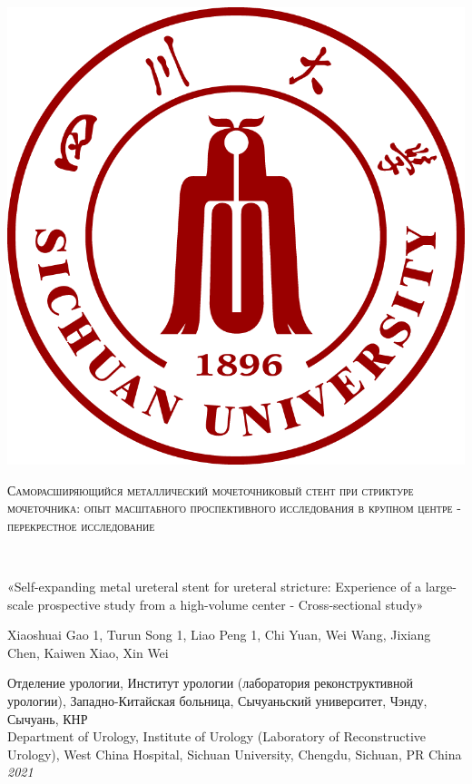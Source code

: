 \vspace*{\fill}
\begin{center}
\includegraphics[scale=0.2]{./res/cover0.png}
{\scshape\huge Саморасширяющийся металлический мочеточниковый стент при стриктуре мочеточника: опыт масштабного проспективного исследования в крупном центре - перекрестное исследование\par}
\vspace{1cm}
\end{center}
\vspace*{\fill}
\newpage

\setlength\columnsep{30pt} 
\begin{multicols}{2}

~\vfill

\noindent 
«Self-expanding metal ureteral stent for ureteral stricture: Experience of a large-scale prospective study from a high-volume center - Cross-sectional study»

 Xiaoshuai Gao 1, Turun Song 1, Liao Peng 1, Chi Yuan, Wei Wang, Jixiang Chen, Kaiwen Xiao, Xin Wei
 
Отделение урологии, Институт урологии (лаборатория реконструктивной урологии), Западно-Китайская больница, Сычуаньский университет, Чэнду, Сычуань, КНР \\

Department of Urology, Institute of Urology (Laboratory of Reconstructive Urology), West China Hospital, Sichuan University, Chengdu, Sichuan, PR China
\noindent \textit{2021}



\columnbreak

\tableofcontents
\newpage

\end{multicols}

